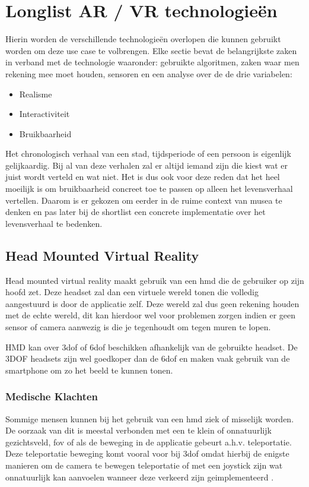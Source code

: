 \chapter{Longlist AR / VR technologieën}
\label{ch:longlist}

Hierin worden de verschillende technologieën overlopen die kunnen gebruikt worden om deze use case te volbrengen.
Elke sectie bevat de belangrijkste zaken in verband met de technologie waaronder: gebruikte algoritmen, zaken waar men rekening mee moet houden, sensoren en een analyse over de de drie variabelen:

\begin{itemize}
    \item Realisme
    \item Interactiviteit
    \item Bruikbaarheid
\end{itemize}

Het chronologisch verhaal van een stad, tijdsperiode of een persoon is eigenlijk gelijkaardig. Bij al van deze verhalen zal er altijd iemand zijn die kiest wat er juist wordt verteld en wat niet. Het is dus ook voor deze reden dat het heel moeilijk is om bruikbaarheid concreet toe te passen op alleen het levensverhaal vertellen. Daarom is er gekozen om eerder in de ruime context van musea te denken en pas later bij de shortlist een concrete implementatie over het levensverhaal te bedenken. 

\section{Head Mounted Virtual Reality}
Head mounted virtual reality maakt gebruik van een \acrshort{hmd} die de gebruiker op zijn hoofd zet. Deze headset zal dan een virtuele wereld tonen die volledig aangestuurd is door de applicatie zelf. Deze wereld zal dus geen rekening houden met de echte wereld, dit kan hierdoor wel voor problemen zorgen indien er geen sensor of camera aanwezig is die je tegenhoudt om tegen muren te lopen.

HMD kan over \acrshort{3dof} of \acrshort{6dof} beschikken afhankelijk van de gebruikte headset. De 3DOF headsets zijn wel goedkoper dan de \acrshort{6dof} en maken vaak gebruik van de smartphone om zo het beeld te kunnen tonen. 
\subsection{Medische Klachten}\label{sec:medical}
Sommige mensen kunnen bij het gebruik van een \acrshort{hmd} ziek of misselijk worden. De oorzaak van dit is meestal verbonden met een te klein of onnatuurlijk gezichtsveld, \acrfull{fov} \autocite{Lin2002} of als de beweging in de applicatie gebeurt a.h.v. teleportatie. Deze teleportatie beweging komt vooral voor bij \acrshort{3dof} omdat hierbij de enigste manieren om de camera te bewegen teleportatie of met een joystick zijn wat onnatuurlijk kan aanvoelen wanneer deze verkeerd zijn geimplementeerd \autocite{Frommel2017}.

